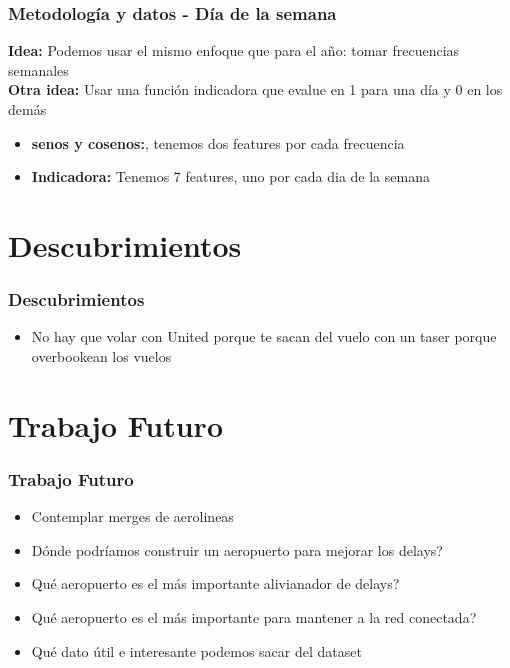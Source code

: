 \documentclass{beamer}
\begin{document}
\begin{frame}
	\frametitle{Metodología y datos - D\'ia de la semana}

	\textbf{Idea:} Podemos usar el mismo enfoque que para el a\~no: tomar frecuencias semanales\\
	\pause
	\textbf{Otra idea:} Usar una funci\'on indicadora que evalue en 1 para una d\'ia y 0 en los dem\'as \\
	\pause
	\begin{itemize}
		\item \textbf{senos y cosenos:}, tenemos dos features por cada frecuencia
		\item \textbf{Indicadora:} Tenemos 7 features, uno por cada dia de la semana
	\end{itemize}


\end{frame}



\section{Descubrimientos}\label{sec:descubrimientos}
\begin	{frame}
\frametitle{Descubrimientos}
\begin{itemize}
\item No hay que volar con United porque te sacan del vuelo con un taser porque overbookean los vuelos
\end{itemize}

\end{frame}

\section{Trabajo Futuro}
\begin{frame}
\frametitle{Trabajo Futuro}
\begin{itemize}
\item Contemplar merges de aerolineas
\item Dónde podríamos construir un aeropuerto para mejorar los delays?
\item Qué aeropuerto es el más importante alivianador de delays?
\item Qué aeropuerto es el más importante para mantener a la red conectada?
\item Qué dato útil e interesante podemos sacar del dataset
\end{itemize}
\end{frame}
\end{document}
